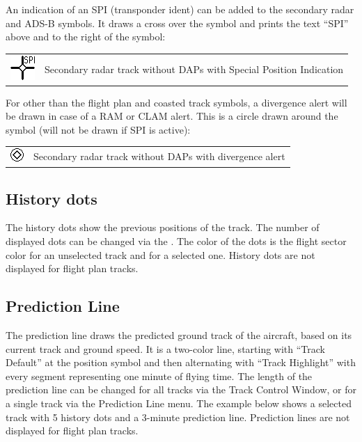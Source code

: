 \documentclass[11pt,a4paper]{memoir}
\newcommand{\colorref}[1]{\textit{\hyperref[#1]{\StrDel{#1}{color:}}}}
\begin{document}
An indication of an SPI (transponder ident) can be added to the secondary radar and ADS-B symbols. It draws a cross over the symbol and prints the text “SPI” above and to the right of the symbol:

\begin{tabular}{l l}
\includegraphics{img/rps_spi.png} & Secondary radar track without DAPs with Special Position Indication
\end{tabular}

For other than the flight plan and coasted track symbols, a divergence alert will be drawn in case of a RAM
or CLAM alert. This is a circle drawn around the symbol (will not be drawn if SPI is active):

\begin{tabular}{l l}
\includegraphics{img/rps_divalert.png}& Secondary radar track without DAPs with divergence alert
\end{tabular}

\subsection{History dots}

The history dots show the previous positions of the track. The number of displayed dots can be changed via the \textit{}. The color of the dots is the flight sector color for an unselected track and \colorref{color:Track Highlight} for a selected one. History dots are not displayed for flight plan tracks.

\subsection{Prediction Line}

The prediction line draws the predicted ground track of the aircraft, based on its current track and ground speed. It is a two-color line, starting with “Track Default” at the position symbol and then alternating with “Track Highlight” with every segment representing one minute of flying time. The length of the prediction line can be changed for all tracks via the Track Control Window, or for a single track via the Prediction Line menu. The example below shows a selected track with 5 history dots and a 3-minute prediction line. Prediction lines are not displayed for flight plan tracks.
\end{document}
